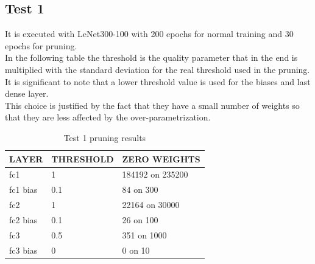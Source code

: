 \documentclass[journal]{vgtc}                %
\begin{document}
\subsection{Test 1}
It is executed with LeNet300-100 with 200 epochs for normal training and 30 epochs for pruning.\\In the following table the threshold is the quality parameter that in the end is multiplied with the standard deviation for the real threshold used in the pruning.\\It is significant to note that a lower threshold value is used for the biases and last dense layer.\\This choice is justified by the fact that they have a small number of weights so that they are less affected by the over-parametrization.
\begin{table}[H]
\caption{Test 1 pruning results}
\label{my-label}
\begin{tabular}{|l|l|l|}
\hline
LAYER    & THRESHOLD & ZERO WEIGHTS     \\ \hline
fc1      & 1         & 184192 on 235200 \\ \hline
fc1 bias & 0.1       & 84 on 300        \\ \hline
fc2      & 1         & 22164 on 30000   \\ \hline
fc2 bias & 0.1       & 26 on 100       \\ \hline
fc3      & 0.5       & 351 on 1000      \\ \hline
fc3 bias & 0         & 0 on 10          \\ \hline
\end{tabular}
\end{table}
\end{document}
